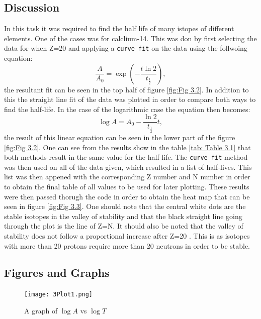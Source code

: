 \documentclass[12pt, a4paper]{article}
\begin{document}
\subsection{Discussion}
In this task it was required to find the half life of many istopes of different elements. One of the cases was for calclium-14. This was don by first selecting the data for when Z=20 and applying a \texttt{curve_fit} on the data using the follwoing equation:
\begin{equation}
    \frac{A}{A_0} = \exp\left(-\frac{t\ln2}{t_\frac{1}{2}}\right) ,
\end{equation}
the resultant fit can be seen in the top half of figure \ref{fig:Fig 3.2}. In addition to this the straight line fit of the data was plotted in order to compare both ways to find the half-life. In the case of the logarithmic case the equation then becomes:
\begin{equation}
    \log{A} = A_0-\frac{\ln2}{t_{\frac{1}{2}}}t ,
\end{equation}
the result of this linear equation can be seen in the lower part of the figure \ref{fig:Fig 3.2}. One can see from the results show in the table \ref{tab: Table 3.1} that both methods result in the same value for the half-life. The \texttt{curve_fit} method was then used on all of the data given, which resulted in a list of half-lives. This list was then appened with the corresponding Z number and N number in order to obtain the final table of all values to be used for later plotting. These results were then passed thorugh the code in order to obtain the heat map that can be seen in figure \ref{fig:Fig 3.3}. One should note that the central white dots are the stable isotopes in the valley of stability \parencite{macintosh2001m} and that the black straight line going through the plot is the line of Z=N. It should also be noted that the valley of stability does not follow a proportional increase after Z=20 \parencite{boutin2002climbing}. This is as isotopes with more than 20 protons require more than 20 neutrons in order to be stable.

\subsection{Figures and Graphs}
\begin{figure}[H]
    \centering
    \texttt{[image: 3Plot1.png]}
    \caption{A graph of \(\log{A}\) vs \(\log{T}\)}
    \label{fig:Fig 3.1}
\end{figure}
\end{document}
